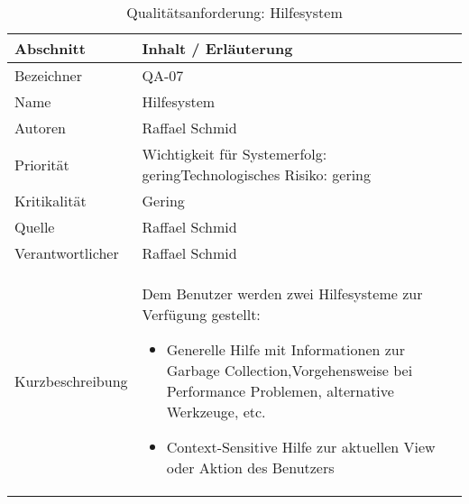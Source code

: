 \begin{longtable}{|p{4cm}|p{10.5cm}|}
    \caption{Qualitätsanforderung: Hilfesystem}\\\hline
   \textbf{Abschnitt} & \textbf{Inhalt / Erläuterung} \\\hline
   Bezeichner & QA-07\\\hline
   Name & Hilfesystem\\\hline
   Autoren & Raffael Schmid\\\hline
   Priorität & Wichtigkeit für Systemerfolg: gering\newline Technologisches Risiko: gering\\\hline
   Kritikalität & Gering\\\hline
   Quelle & Raffael Schmid\\\hline
   Verantwortlicher & Raffael Schmid\\\hline
   Kurzbeschreibung & Dem Benutzer werden zwei Hilfesysteme zur Verfügung gestellt: 
	\begin{itemize}
		\item Generelle Hilfe mit Informationen zur Garbage Collection,Vorgehensweise bei Performance Problemen, alternative Werkzeuge, etc. 
		\item Context-Sensitive Hilfe zur aktuellen View oder Aktion des Benutzers
	\end{itemize}\\\hline
\end{longtable}

